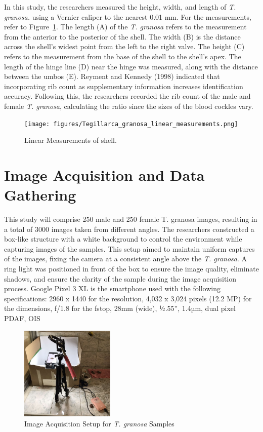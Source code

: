 In this study, the researchers measured the height, width, and length of \textit{T. granosa.} using a Vernier caliper to the nearest 0.01 mm. For the measurements, refer to Figure~\ref{fig:linear_measurements}. The length (A) of the \textit{T. granosa} refers to the measurement from the anterior to the posterior of the shell. The width (B) is the distance across the shell’s widest point from the left to the right valve. The height (C) refers to the measurement from the base of the shell to the shell’s apex. The length of the hinge line (D) near the hinge was measured, along with the distance between the umbos (E). 
Reyment and Kennedy (1998) indicated that incorporating rib count as supplementary information increases identification accuracy. Following this, the researchers recorded the rib count of the male and female \textit{T. granosa}, calculating the ratio since the sizes of the blood cockles vary. 

\begin{figure}[!htbp]
	\centering
	\texttt{[image: figures/Tegillarca\_granosa\_linear\_measurements.png]}
	\caption{Linear Measurements of  \Tegillarcagranosa shell.}
	\label{fig:linear_measurements}
\end{figure}

\section{Image Acquisition and Data Gathering}
\label{sec:imageprocess}
This study will comprise 250 male and 250 female T. granosa images, resulting in a total of 3000 images taken from different angles. The researchers constructed a box-like structure with a white background to control the environment while capturing images of the samples. This setup aimed to maintain uniform captures of the images, fixing the camera at a consistent angle above the \textit{T. granosa}. A ring light was positioned in front of the box to ensure the image quality, eliminate shadows, and ensure the clarity of the sample during the image acquisition process. Google Pixel 3 XL is the smartphone used with the following specifications: 2960 x 1440 for the resolution, 4,032 x 3,024 pixels (12.2 MP) for the dimensions, f/1.8 for the fstop, 28mm (wide), ½.55”, 1.4µm, dual pixel PDAF, OIS \cite{concepcion2023}

\begin{figure}[!htbp]
	\centering
	\includegraphics[width=0.4\textwidth]{figures/setup.jpg}
	\caption{Image Acquisition Setup for \textit{T. granosa} Samples}
	\label{fig: setup}
\end{figure}

